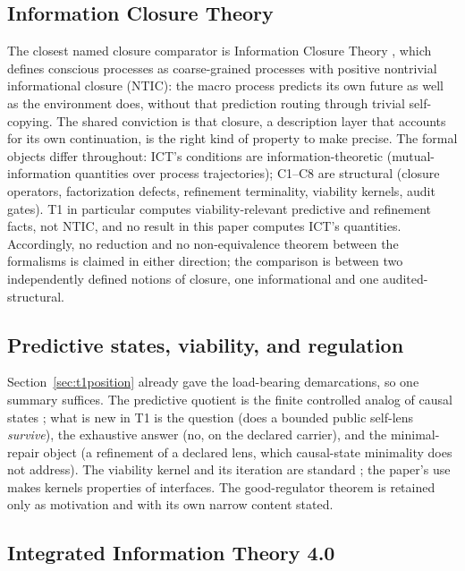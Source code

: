 \documentclass[11pt]{article}
\theoremstyle{definition}
\begin{document}
\subsection{Information Closure Theory}

The closest named closure comparator is Information Closure Theory
\citep{ChangEtAl2020InformationClosure}, which defines conscious processes as
coarse-grained processes with positive nontrivial informational closure
(NTIC): the macro process predicts its own future as well as the environment
does, without that prediction routing through trivial self-copying. The
shared conviction is that closure, a description layer that accounts for
its own continuation, is the right kind of property to make precise. The
formal objects differ throughout: ICT's conditions are
information-theoretic (mutual-information quantities over process
trajectories); C1--C8 are structural (closure operators, factorization
defects, refinement terminality, viability kernels, audit gates). T1 in
particular computes viability-relevant predictive and refinement facts, not
NTIC, and no result in this paper computes ICT's quantities. Accordingly, no
reduction and no non-equivalence theorem between the formalisms is claimed in
either direction; the comparison is between two independently defined notions
of closure, one informational and one audited-structural.

\subsection{Predictive states, viability, and regulation}

Section~\ref{sec:t1position} already gave the load-bearing demarcations, so
one summary suffices. The predictive quotient is the finite controlled
analog of causal states \citep{CrutchfieldYoung1989, ShaliziCrutchfield2001};
what is new in T1 is the question (does a bounded public self-lens
\emph{survive}), the exhaustive answer (no, on the declared carrier), and the
minimal-repair object (a refinement of a declared lens, which causal-state
minimality does not address). The viability kernel and its iteration are
standard \citep{AnayaEtAl2009Viability, AubinBayenSaintPierre2011}; the
paper's use makes kernels properties of interfaces. The good-regulator
theorem \citep{ConantAshby1970} is retained only as motivation and with its
own narrow content stated.

\subsection{Integrated Information Theory 4.0}
\end{document}

